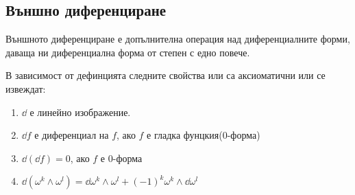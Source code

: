 \documentclass[12pt]{article}
\begin{document}
\begin{large}
\subsection{Външно диференциране}
Външното диференциране е допълнителна операция над диференциалните форми, даваща ни диференциална форма от степен с едно повече.

В зависимост от дефинцията следните свойства или са аксиоматични или се извеждат:
\begin{enumerate}
\item $\dd$ е линейно изображение.
\item $\dd f$ е диференциал на $f$, ако $f$ е гладка фунцкия($0$-форма)
\item $\dd (\dd f)=0$, ако $f$ е $0$-форма
\item $\dd (\omega^k \wedge \omega^l)=\dd \omega^k \wedge \omega^l + (-1)^k \omega^k \wedge \dd \omega^l$
\end{enumerate}


\end{large}
\end{document}
